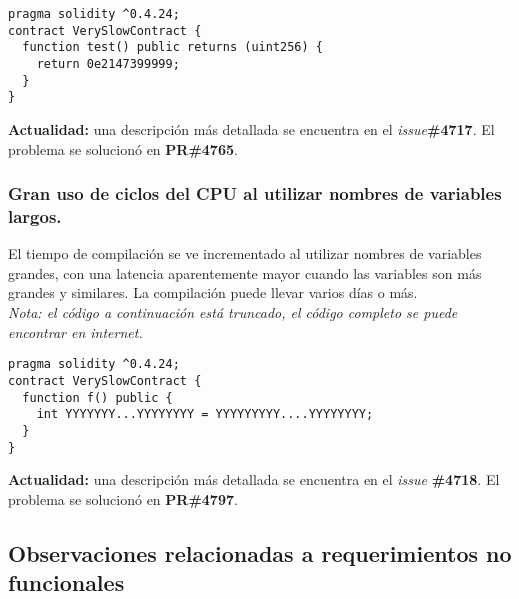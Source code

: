 \begin{lstlisting}[language=Solidity, caption={Código de ejemplo literal numérico}]
pragma solidity ^0.4.24;                                                  
contract VerySlowContract {                                                                                                                                
  function test() public returns (uint256) {                                                                                                   
    return 0e2147399999;                                                                                                                       
  }                                                                                                                                            
}
\end{lstlisting}

\textbf{Actualidad:} una descripción más detallada se encuentra en el \textit{issue}\textbf{\#4717}\cite{GHI4717}. El problema se solucionó en \textbf{PR\#4765}\cite{GHPR4765}.\\

\subsubsection{Gran uso de ciclos del CPU al utilizar nombres de variables largos.}

El tiempo de compilación se ve incrementado al utilizar nombres de variables grandes, con una latencia aparentemente mayor cuando las variables son más grandes y similares. La compilación puede llevar varios días o más.\\

\textit{Nota: el código a continuación está truncado, el código completo se puede encontrar en internet\cite{GistMattaerealTruncated}.}\\

\begin{lstlisting}[language=Solidity, caption={Código de ejemplo nombre de variable largo}]
pragma solidity ^0.4.24;
contract VerySlowContract {
  function f() public {
    int YYYYYYY...YYYYYYYY = YYYYYYYYY....YYYYYYYY;      
  }
}
\end{lstlisting}

\textbf{Actualidad:} una descripción más detallada se encuentra en el \textit{issue} \textbf{\#4718}\cite{GHI4718}. El problema se solucionó en \textbf{PR\#4797}\cite{GHPR4797}.\\

\subsection{Observaciones relacionadas a requerimientos no funcionales}

